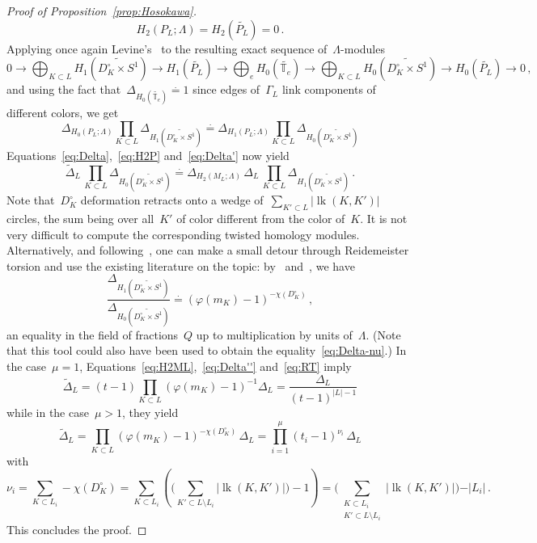 \documentclass{amsart}
\DeclareMathOperator{\lk}{lk}
\newcommand{\de}{\stackrel{\cdot}{=}}
\theoremstyle{definition}
\theoremstyle{remark}
\begin{document}
\begin{proof}[Proof of Proposition~\ref{prop:Hosokawa}]
\begin{equation}
\label{eq:H2P}
H_2(P_L;\Lambda)=H_2(\widetilde{P_L})=0\,.
\end{equation}
Applying once again Levine's~\cite[Lemma~5]{Lev67} to the resulting exact sequence of~$\Lambda$-modules
\[
0\to\bigoplus_{K\subset L} H_1(\widetilde{D^\circ_K\times S^1})
\to H_1(\widetilde{P_L})
\to\bigoplus_{e} H_0(\widetilde{\mathbb{T}_e})\to\bigoplus_{K\subset L} H_0(\widetilde{D^\circ_K\times S^1})\to H_0(\widetilde{P_L})\to 0\,,
\]
and using the fact that~$\Delta_{H_0(\widetilde{\mathbb{T}_e})}\stackrel{\cdot}{=}1$ since edges of~$\Gamma_L$ link components of different colors, we get
\begin{equation}
\label{eq:Delta'}
\Delta_{H_0(P_L;\Lambda)}\prod_{K\subset L}\Delta_{H_1(\widetilde{D^\circ_K\times S^1})}\stackrel{\cdot}{=}\Delta_{H_1(P_L;\Lambda)}\prod_{K\subset L}\Delta_{H_0(\widetilde{D^\circ_K\times S^1})}
\end{equation}
Equations~\eqref{eq:Delta},~\eqref{eq:H2P} and~\eqref{eq:Delta'} now yield
\begin{equation}
\label{eq:Delta''}
\widetilde{\Delta}_L\,\prod_{K\subset L}\Delta_{H_0(\widetilde{D^\circ_K\times S^1})}\stackrel{\cdot}{=}
	\Delta_{H_2(M_L;\Lambda)}\,\Delta_L\,\prod_{K\subset L}\Delta_{H_1(\widetilde{D^\circ_K\times S^1})}\,.
\end{equation}
Note that~$D^\circ_K$ deformation retracts onto a wedge of~$\sum_{K'\subset L}\vert\lk(K,K')\vert$ circles,
the sum being over all~$K'$ of color different from the color of~$K$. It is not very difficult to compute the corresponding
twisted homology modules. Alternatively, and following~\cite{BFP16}, one can make a small detour through Reidemeister
torsion and use the existing literature on the topic: by~\cite[Theorem~4.7]{Tur01} and~\cite[Example~2.7]{Nic03}, we have
\begin{equation}
\label{eq:RT}
\frac{\Delta_{H_1(\widetilde{D^\circ_K\times S^1})}}{\Delta_{H_0(\widetilde{D^\circ_K\times S^1})}}\de (\varphi(m_K)-1)^{-\chi(D^\circ_K)}\,,
\end{equation}
an equality in the field of fractions~$Q$ up to multiplication by units of~$\Lambda$.
(Note that this tool could also have been used to obtain the equality~\eqref{eq:Delta-nu}.) In the case~$\mu=1$, Equations~\eqref{eq:H2ML},~\eqref{eq:Delta''} and~\eqref{eq:RT} imply
\[
\widetilde{\Delta}_L=(t-1)\prod_{K\subset L}(\varphi(m_K)-1)^{-1}\Delta_L=\frac{\Delta_L}{(t-1)^{\vert L\vert -1}}
\]
while in the case~$\mu>1$, they yield
\[
\widetilde{\Delta}_L=\prod_{K\subset L}(\varphi(m_K)-1)^{-\chi(D_K^\circ)}\,\Delta_L=\prod_{i=1}^\mu(t_i-1)^{\nu_i}\,\Delta_L
\]
with
\[
\nu_i=\sum_{K\subset L_i}-\chi(D_K^\circ)=\sum_{K\subset L_i}\left(\Big(\sum_{K'\subset L\setminus L_i}\vert\lk(K,K')\vert\Big)-1\right)=\Big(\sum_{\substack{K\subset L_i\\ K'\subset L\setminus L_i}}\vert\lk(K,K')\vert\Big)-\vert L_i\vert\,.
\]
This concludes the proof.
	\end{proof}
	
\end{document}
